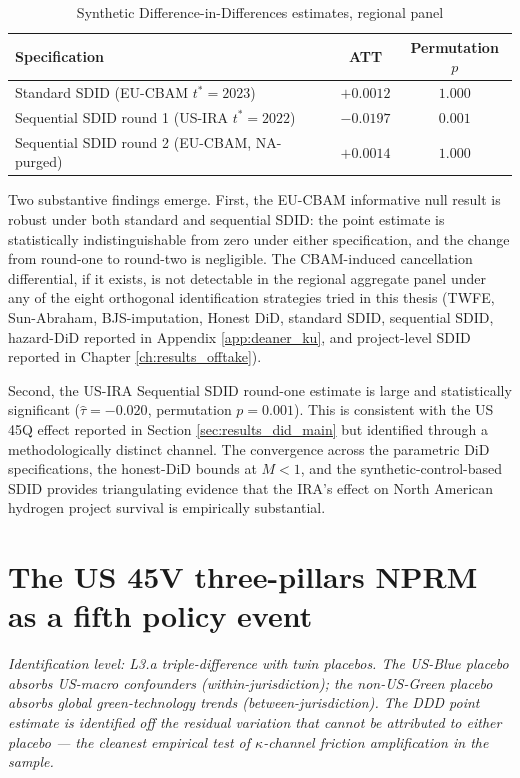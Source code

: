 \begin{table}[!htbp]
\centering
\caption{Synthetic Difference-in-Differences estimates, regional panel}
\label{tab:ch6-sdid}
\begin{tabular}{lcc}
\toprule
Specification & ATT & Permutation $p$ \\
\midrule
Standard SDID (EU-CBAM $t^* = 2023$) & $+0.0012$ & $1.000$ \\
Sequential SDID round 1 (US-IRA $t^* = 2022$) & $-0.0197$ & $0.001$ \\
Sequential SDID round 2 (EU-CBAM, NA-purged) & $+0.0014$ & $1.000$ \\
\bottomrule
\end{tabular}
\end{table}

Two substantive findings emerge. First, the EU-CBAM informative null result is robust under both standard and sequential SDID: the point estimate is statistically indistinguishable from zero under either specification, and the change from round-one to round-two is negligible. The CBAM-induced cancellation differential, if it exists, is not detectable in the regional aggregate panel under any of the eight orthogonal identification strategies tried in this thesis (TWFE, Sun-Abraham, BJS-imputation, Honest DiD, standard SDID, sequential SDID, hazard-DiD reported in Appendix \ref{app:deaner_ku}, and project-level SDID reported in Chapter \ref{ch:results_offtake}).

Second, the US-IRA Sequential SDID round-one estimate is large and statistically significant ($\hat{\tau} = -0.020$, permutation $p = 0.001$). This is consistent with the US 45Q effect reported in Section \ref{sec:results_did_main} but identified through a methodologically distinct channel. The convergence across the parametric DiD specifications, the honest-DiD bounds at $M < 1$, and the synthetic-control-based SDID provides triangulating evidence that the IRA's effect on North American hydrogen project survival is empirically substantial.

\section{The US 45V three-pillars NPRM as a fifth policy event}
\noindent\emph{Identification level: L3.a triple-difference with twin placebos. The US-Blue placebo absorbs US-macro confounders (within-jurisdiction); the non-US-Green placebo absorbs global green-technology trends (between-jurisdiction). The DDD point estimate is identified off the residual variation that cannot be attributed to either placebo --- the cleanest empirical test of $\kappa$-channel friction amplification in the sample.}

